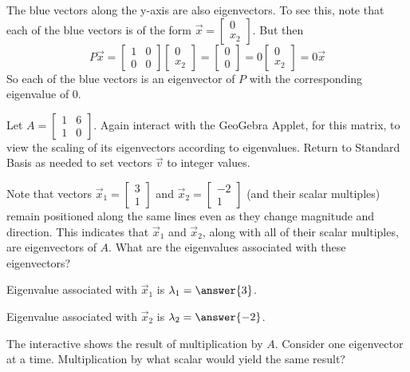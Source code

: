 \documentclass{ximera}
\begin{document}
\begin{example}
\begin{explanation}
The blue vectors along the y-axis are also eigenvectors.  To see this, note that each of the blue vectors is of the form $\vec{x}=\begin{bmatrix}0\\x_2\end{bmatrix}$.  But then $$P\vec{x}=\begin{bmatrix}1&0\\0&0\end{bmatrix}\begin{bmatrix}0\\x_2\end{bmatrix}=\begin{bmatrix}0\\0\end{bmatrix}=0\begin{bmatrix}0\\x_2\end{bmatrix}=0\vec{x}$$
So each of the blue vectors is an eigenvector of $P$ with the corresponding eigenvalue of $0$.
\end{explanation}
\end{example}
    
\begin{exploration}\label{exp:eigenvectors}
Let $A=\begin{bmatrix}1&6\\1&0\end{bmatrix}$.  Again interact with the GeoGebra Applet, for this matrix, to view the scaling of its eigenvectors according to eigenvalues. Return to Standard Basis as needed to set vectors $\vec{v}$ to integer values.
    
    
\begin{center}
\end{center}
    
\begin{question}
Note that vectors $\vec{x}_1=\begin{bmatrix}3\\1\end{bmatrix}$ and $\vec{x}_2=\begin{bmatrix}-2\\1\end{bmatrix}$ (and their scalar multiples) remain positioned along the same lines even as they change magnitude and direction.  This indicates that $\vec{x}_1$ and $\vec{x}_2$, along with all of their scalar multiples, are eigenvectors of $A$.  What are the eigenvalues associated with these eigenvectors?
    
Eigenvalue associated with $\vec{x}_1$ is $\lambda_1=\answer{3}$.
    
Eigenvalue associated with $\vec{x}_2$ is $\lambda_2=\answer{-2}$.
    
\begin{hint}
    The interactive shows the result of multiplication by $A$.
    Consider one eigenvector at a time.  Multiplication by what scalar would yield the same result?
\end{hint}
\end{question}
\end{exploration}
    
\end{document}
